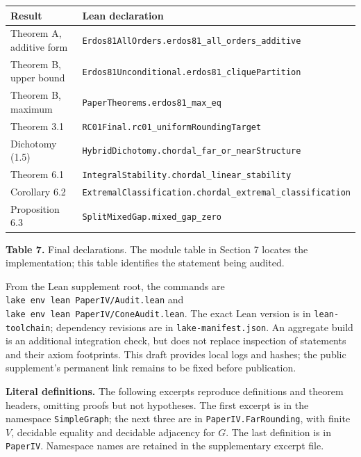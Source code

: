 \documentclass[english,11pt,a4paper]{article}
\newcounter{none}
\begin{document}

{\def\LTcaptype{none} %
\begin{longtable}[c]{@{}
  >{\raggedright\arraybackslash}p{}
  >{\raggedright\arraybackslash}p{}@{}}
\toprule\noalign{}
\begin{minipage}[b]{\linewidth}\raggedright
Result
\end{minipage} & \begin{minipage}[b]{\linewidth}\raggedright
Lean declaration
\end{minipage} \\
\midrule\noalign{}
\endhead
\bottomrule\noalign{}
\endlastfoot
Theorem A, additive form & \nolinkurl{Erdos81AllOrders.erdos81_all_orders_additive} \\
Theorem B, upper bound & \nolinkurl{Erdos81Unconditional.erdos81_cliquePartition} \\
Theorem B, maximum & \nolinkurl{PaperTheorems.erdos81_max_eq} \\
Theorem 3.1 & \nolinkurl{RC01Final.rc01_uniformRoundingTarget} \\
Dichotomy (1.5) & \nolinkurl{HybridDichotomy.chordal_far_or_nearStructure} \\
Theorem 6.1 & \nolinkurl{IntegralStability.chordal_linear_stability} \\
Corollary 6.2 & \nolinkurl{ExtremalClassification.chordal_extremal_classification} \\
Proposition 6.3 & \nolinkurl{SplitMixedGap.mixed_gap_zero} \\
\end{longtable}
}

\textbf{Table 7.} Final declarations. The module table in Section 7 locates the implementation; this table identifies the statement being audited.

From the Lean supplement root, the commands are \texttt{lake\ env\ lean\ PaperIV/Audit.lean} and \texttt{lake\ env\ lean\ PaperIV/ConeAudit.lean}. The exact Lean version is in \nolinkurl{lean-toolchain}; dependency revisions are in \nolinkurl{lake-manifest.json}. An aggregate build is an additional integration check, but does not replace inspection of statements and their axiom footprints. This draft provides local logs and hashes; the public supplement's permanent link remains to be fixed before publication.

\textbf{Literal definitions.} The following excerpts reproduce definitions and theorem headers, omitting proofs but not hypotheses. The first excerpt is in the namespace \nolinkurl{SimpleGraph}; the next three are in \nolinkurl{PaperIV.FarRounding}, with finite \(V\), decidable equality and decidable adjacency for \(G\). The last definition is in \nolinkurl{PaperIV}. Namespace names are retained in the supplementary excerpt file.
\end{document}
